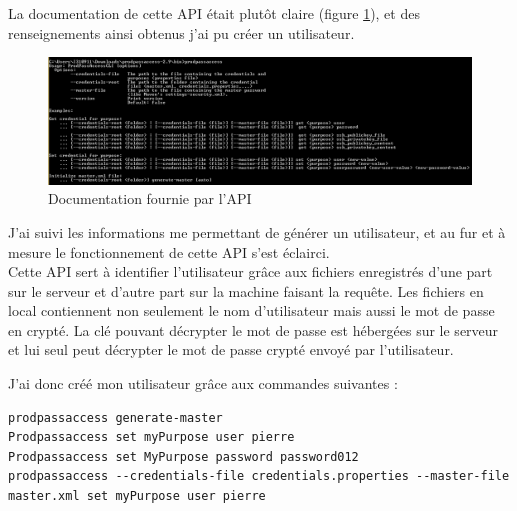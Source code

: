 La documentation de cette API était plutôt claire (figure \ref{figure:prodpassaccessdoc}), et des renseignements ainsi obtenus j'ai pu créer un utilisateur.
\begin{figure}[!h]
  \centering
      \includegraphics[width=\textwidth]{images/prodpassaccessdoc.png}
  \caption{Documentation fournie par l'API}
	\label{figure:prodpassaccessdoc}
\end{figure}


J'ai suivi les informations me permettant de générer un utilisateur, et au fur et à mesure le fonctionnement de cette API s'est éclairci.\\
Cette API sert à identifier l'utilisateur grâce aux fichiers enregistrés d'une part sur le serveur et d'autre part sur la machine faisant la requête. Les fichiers en local contiennent non seulement le nom d'utilisateur mais aussi le mot de passe en crypté. La clé pouvant décrypter le mot de passe est hébergées sur le serveur et lui seul peut décrypter le mot de passe crypté envoyé par l'utilisateur.

J'ai donc créé mon utilisateur grâce aux commandes suivantes :\\
\begin{lstlisting}
prodpassaccess generate-master 
Prodpassaccess set myPurpose user pierre
Prodpassaccess set MyPurpose password password012
prodpassaccess --credentials-file credentials.properties --master-file master.xml set myPurpose user pierre
\end{lstlisting}

